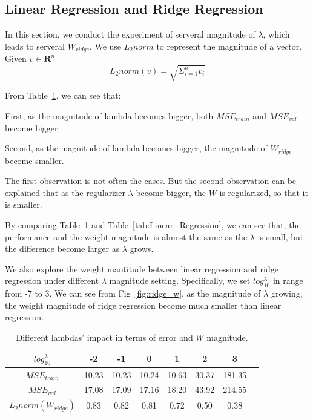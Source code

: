 \documentclass[journal, a4paper]{IEEEtran}
\begin{document}
\subsection{Linear Regression and Ridge Regression}
In this section, we conduct the experiment of serveral magnitude of $\lambda$, which leads to serveral $W_{ridge}$. We use $L_2{norm}$ to represent the magnitude of a vector. Given $v \in \mathbf{R}^{n}$
\begin{equation}
	L_2norm(v) = \sqrt{\Sigma_{i=1}^{n} v_{i}}
\end{equation} \par
From Table~\ref{tab:Ridge_Regression}, we can see that: \par
First, as the magnitude of lambda becomes bigger, both $MSE_{train}$ and $MSE_{val}$ become bigger. \par
Second, as the magnitude of lambda becomes bigger, the magnitude of $W_{ridge}$ become smaller. \par
The first observation is not often the cases. But the second observation can be explained that as the regularizer $\lambda$ become bigger, the $W$ is regularized, so that it is smaller. \par
By comparing Table~\ref{tab:Ridge_Regression} and Table~\ref{tab:Linear_Regression}, we can see that, the performance and the weight magnitude is almost the same as the $\lambda$ is small, but the difference become larger as $\lambda$ grows. \par
We also explore the weight mantitude between linear regression and ridge regression under different $\lambda$ magnitude setting. Specifically, we set $log_{10}^{\lambda}$ in range from -7 to 3. We can see from Fig~\ref{fig:ridge_w}, as the magnitude of $\lambda$ growing, the weight magnitude of ridge regression become much smaller than linear regression. \par
\begin{table}[!hbt]
	\begin{center}
		\caption{Different lambdas' impact in terms of error and $W$ magnitude.}
		\label{tab:Ridge_Regression}
		\begin{tabular}{|c|c|c|c|c|c|c|c|}
			\hline
			$log_{10}^{\lambda}$ & -2 & -1 & 0 & 1 & 2 & 3 \\
			\hline
			$MSE_{train}$   & 10.23 & 10.23 & 10.24 & 10.63 & 30.37 & 181.35   \\
			\hline
			$MSE_{val}$  & 17.08 & 17.09 & 17.16 & 18.20 & 43.92 & 214.55   \\
			\hline
			$L_2norm(W_{ridge})$  & 0.83 & 0.82 & 0.81 & 0.72 & 0.50 & 0.38 \\
			\hline
		\end{tabular}
	\end{center}
\end{table}
\end{document}
